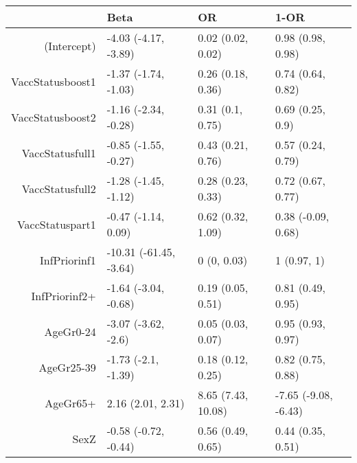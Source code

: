 \begin{table}[ht]
\centering
\begin{tabular}{rlll}
  \hline
 & Beta & OR & 1-OR \\ 
  \hline
(Intercept) & -4.03 (-4.17, -3.89) & 0.02 (0.02, 0.02) & 0.98 (0.98, 0.98) \\ 
  VaccStatusboost1 & -1.37 (-1.74, -1.03) & 0.26 (0.18, 0.36) & 0.74 (0.64, 0.82) \\ 
  VaccStatusboost2 & -1.16 (-2.34, -0.28) & 0.31 (0.1, 0.75) & 0.69 (0.25, 0.9) \\ 
  VaccStatusfull1 & -0.85 (-1.55, -0.27) & 0.43 (0.21, 0.76) & 0.57 (0.24, 0.79) \\ 
  VaccStatusfull2 & -1.28 (-1.45, -1.12) & 0.28 (0.23, 0.33) & 0.72 (0.67, 0.77) \\ 
  VaccStatuspart1 & -0.47 (-1.14, 0.09) & 0.62 (0.32, 1.09) & 0.38 (-0.09, 0.68) \\ 
  InfPriorinf1 & -10.31 (-61.45, -3.64) & 0 (0, 0.03) & 1 (0.97, 1) \\ 
  InfPriorinf2+ & -1.64 (-3.04, -0.68) & 0.19 (0.05, 0.51) & 0.81 (0.49, 0.95) \\ 
  AgeGr0-24 & -3.07 (-3.62, -2.6) & 0.05 (0.03, 0.07) & 0.95 (0.93, 0.97) \\ 
  AgeGr25-39 & -1.73 (-2.1, -1.39) & 0.18 (0.12, 0.25) & 0.82 (0.75, 0.88) \\ 
  AgeGr65+ & 2.16 (2.01, 2.31) & 8.65 (7.43, 10.08) & -7.65 (-9.08, -6.43) \\ 
  SexZ & -0.58 (-0.72, -0.44) & 0.56 (0.49, 0.65) & 0.44 (0.35, 0.51) \\ 
   \hline
\end{tabular}
\end{table}
